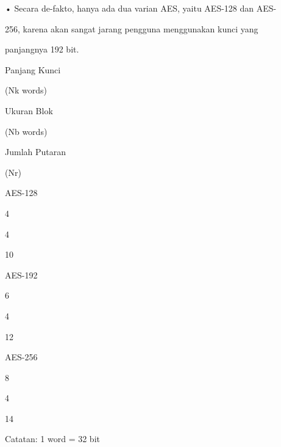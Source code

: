 \documentclass{article}
\begin{document}

• Secara de-fakto, hanya ada dua varian AES, yaitu AES-128 dan AES-

256, karena akan sangat jarang pengguna menggunakan kunci yang 

panjangnya 192 bit.


Panjang Kunci 

(Nk words) 

Ukuran Blok 

(Nb words) 

Jumlah Putaran 

(Nr) 

AES-128 

4 

4 

10 

AES-192 

6 

4 

12 

AES-256 

8 

4 

14 


Catatan: 1 word = 32 bit
\end{document}
